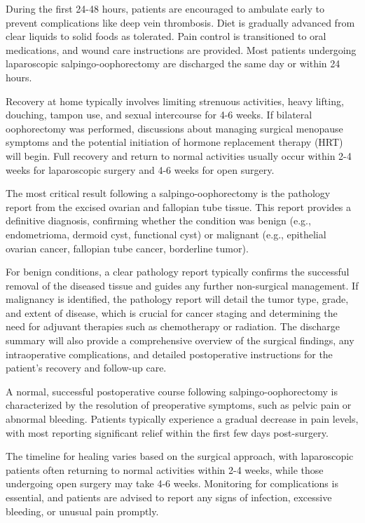 During the first 24-48 hours, patients are encouraged to ambulate early to prevent complications like deep vein thrombosis. Diet is gradually advanced from clear liquids to solid foods as tolerated. Pain control is transitioned to oral medications, and wound care instructions are provided. Most patients undergoing laparoscopic salpingo-oophorectomy are discharged the same day or within 24 hours. 

Recovery at home typically involves limiting strenuous activities, heavy lifting, douching, tampon use, and sexual intercourse for 4-6 weeks. If bilateral oophorectomy was performed, discussions about managing surgical menopause symptoms and the potential initiation of hormone replacement therapy (HRT) will begin. Full recovery and return to normal activities usually occur within 2-4 weeks for laparoscopic surgery and 4-6 weeks for open surgery.

The most critical result following a salpingo-oophorectomy is the pathology report from the excised ovarian and fallopian tube tissue. This report provides a definitive diagnosis, confirming whether the condition was benign (e.g., endometrioma, dermoid cyst, functional cyst) or malignant (e.g., epithelial ovarian cancer, fallopian tube cancer, borderline tumor). 

For benign conditions, a clear pathology report typically confirms the successful removal of the diseased tissue and guides any further non-surgical management. If malignancy is identified, the pathology report will detail the tumor type, grade, and extent of disease, which is crucial for cancer staging and determining the need for adjuvant therapies such as chemotherapy or radiation. The discharge summary will also provide a comprehensive overview of the surgical findings, any intraoperative complications, and detailed postoperative instructions for the patient's recovery and follow-up care.

A normal, successful postoperative course following salpingo-oophorectomy is characterized by the resolution of preoperative symptoms, such as pelvic pain or abnormal bleeding. Patients typically experience a gradual decrease in pain levels, with most reporting significant relief within the first few days post-surgery. 

The timeline for healing varies based on the surgical approach, with laparoscopic patients often returning to normal activities within 2-4 weeks, while those undergoing open surgery may take 4-6 weeks. Monitoring for complications is essential, and patients are advised to report any signs of infection, excessive bleeding, or unusual pain promptly.

